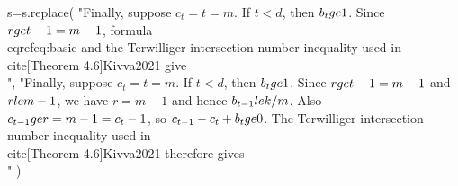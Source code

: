 s=s.replace(
"Finally, suppose $c_t=t=m$. If $t<d$, then $b_t\\ge1$. Since $r\\ge t-1=m-1$, formula \\eqref{eq:basic} and the Terwilliger intersection-number inequality used in \\cite[Theorem 4.6]{Kivva2021} give\n\\[\n \\frac{k}{m}\\ge b_{t-1}\n \\ge c_{t-1}-c_t+b_t+\\lambda+2\n \\ge\\lambda+2\\ge\\frac{k}{m}+1,\n\\]",
"Finally, suppose $c_t=t=m$. If $t<d$, then $b_t\\ge1$. Since $r\\ge t-1=m-1$ and $r\\le m-1$, we have $r=m-1$ and hence $b_{t-1}\\le k/m$. Also $c_{t-1}\\ge r=m-1=c_t-1$, so $c_{t-1}-c_t+b_t\\ge0$. The Terwilliger intersection-number inequality used in \\cite[Theorem 4.6]{Kivva2021} therefore gives\n\\[\n \\frac{k}{m}\\ge b_{t-1}\n \\ge c_{t-1}-c_t+b_t+\\lambda+2\n \\ge\\lambda+2\\ge\\frac{k}{m}+1,\n\\]"
)

